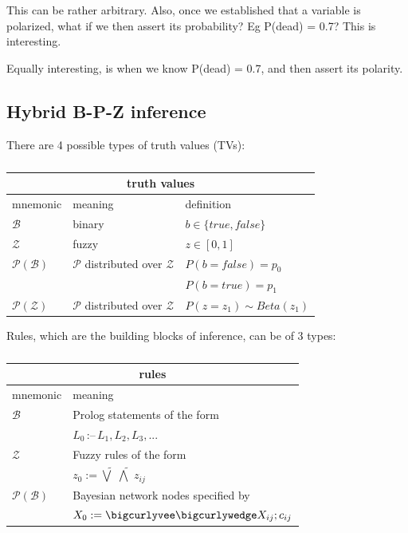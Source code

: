 This can be rather arbitrary.  Also, once we established that a variable is polarized, what if we then assert its probability?  Eg P(dead) = 0.7?  This is interesting.

Equally interesting, is when we know P(dead) = 0.7, and then assert its polarity.

\subsection{Hybrid B-P-Z inference}

There are 4 possible types of truth values (TVs):

\begin{table}[H]
\parbox{3cm}{\caption{}}
\begin{tabular}{|l|l|l|} \hline
\multicolumn{3}{|c|}{\textbf{truth values}}\\ \hline
mnemonic                   & meaning                                      & definition \\ \hline
$\mathcal{B}$              & binary                                       & $b \in \{true, false\} $\\
$\mathcal{Z}$              & fuzzy                                        & $z \in [0,1] $\\
$\mathcal{P}(\mathcal{B})$ & $\mathcal{P}$ distributed over $\mathcal{Z}$ & $ P(b=false) = p_0 $\\
                           &                                              & $ P(b=true) = p_1 $\\
$\mathcal{P}(\mathcal{Z})$ & $\mathcal{P}$ distributed over $\mathcal{Z}$ & $ P(z=z_1) \sim Beta(z_1) $\\ \hline
\end{tabular}
\end{table}

Rules, which are the building blocks of inference, can be of 3 types:

\begin{table}[H]
\parbox{3cm}{\caption{}}
\begin{tabular}{|l|l|} \hline
\multicolumn{2}{|c|}{\textbf{rules}}\\ \hline
mnemonic                   & meaning\\ \hline
$\mathcal{B}$              & Prolog statements of the form\\
                           & \qquad $L_0 \, \mbox{:--} \, L_1, L_2, L_3, ... $ \\
$\mathcal{Z}$              & Fuzzy rules of the form\\
                           & \qquad $z_0 := \widetilde{\bigvee} \; \widetilde{\bigwedge} \; z_{ij}$ \\
$\mathcal{P}(\mathcal{B})$ & Bayesian network nodes specified by\\
                           & \qquad $X_0 := \bigcurlyvee \bigcurlywedge X_{ij};c_{ij}$ \\
\hline
\end{tabular}
\end{table}

